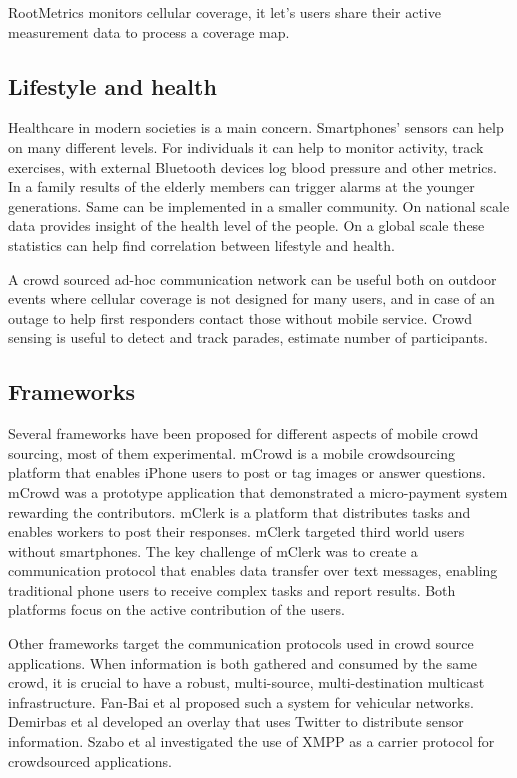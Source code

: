 \documentclass[conference,letterpaper]{IEEEtran}
\begin{document}
RootMetrics monitors cellular coverage, it let's users share their active measurement data to process a coverage map.

\subsection{Lifestyle and health}
Healthcare in modern societies is a main concern. Smartphones' sensors can help on many different levels. For individuals it can help to monitor activity, track exercises, with external Bluetooth devices log blood pressure and other metrics. In a family results of the elderly members can trigger alarms at the younger generations. Same can be implemented in a smaller community. On national scale data provides insight of the health level of the people. On a global scale these statistics can help find correlation between lifestyle and health.

A crowd sourced ad-hoc communication network can be useful both on outdoor events where cellular coverage is not designed for many users, and in case of an outage to help first responders contact those without mobile service. Crowd sensing is useful to detect and track parades, estimate number of participants.

\subsection{Frameworks}
Several frameworks have been proposed for different aspects of mobile crowd sourcing, most of them experimental. mCrowd is a mobile crowdsourcing platform that enables iPhone users to post or tag images or answer questions. mCrowd was a prototype application that demonstrated a micro-payment system rewarding the contributors.
mClerk is a platform that distributes tasks and enables workers to post their responses. mClerk targeted third world users without smartphones. The key challenge of mClerk was to create a communication protocol that enables data transfer over text messages, enabling traditional phone users to receive complex tasks and report results. Both platforms focus on the active contribution of the users.

Other frameworks target the communication protocols used in crowd source applications. When information is both gathered and consumed by the same crowd, it is crucial to have a robust, multi-source, multi-destination multicast infrastructure. Fan-Bai et al proposed such a system for vehicular networks. Demirbas et al developed an overlay that uses Twitter to distribute sensor information. Szabo et al investigated the use of XMPP as a carrier protocol for crowdsourced applications.
\end{document}
